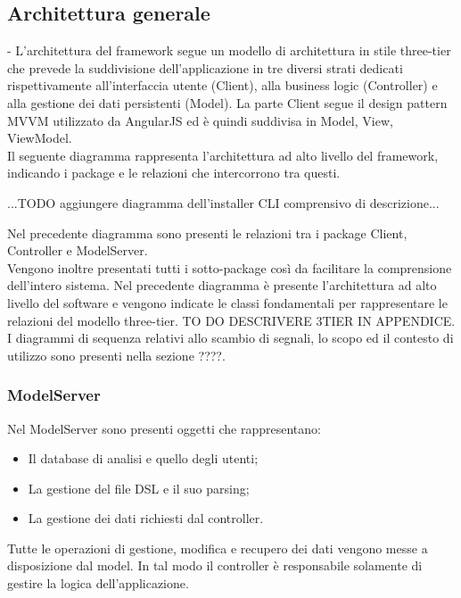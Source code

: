 \subsection{Architettura generale}
-	L'architettura del framework segue un modello di architettura in stile three-tier che prevede la suddivisione dell'applicazione  in tre diversi strati dedicati rispettivamente all'interfaccia utente (Client), alla business logic (Controller) e alla gestione dei dati persistenti (Model). La parte Client segue il design pattern MVVM utilizzato da AngularJS ed è quindi suddivisa in Model, View, ViewModel.\\


Il seguente diagramma rappresenta l'architettura ad alto livello del framework, indicando i package e le relazioni che intercorrono tra questi.

...TODO aggiungere diagramma dell'installer CLI comprensivo di descrizione...

Nel precedente diagramma sono presenti le relazioni tra i package Client, Controller e ModelServer.\\
Vengono inoltre presentati tutti i sotto-package così da facilitare la comprensione dell'intero sistema.
Nel precedente diagramma è presente l'architettura ad alto livello del software e vengono indicate le classi fondamentali per rappresentare le relazioni del modello  three-tier. TO DO DESCRIVERE 3TIER IN APPENDICE. I diagrammi di sequenza relativi allo scambio di segnali, lo scopo ed il contesto di utilizzo sono presenti nella sezione ????.

\newpage
\subsubsection{ModelServer}
Nel ModelServer sono presenti oggetti che rappresentano:
\begin{itemize}
\item Il database di analisi e quello degli utenti;
\item La gestione del file DSL e il suo parsing;
\item La gestione dei dati richiesti dal controller.
\end{itemize}
Tutte le operazioni di gestione, modifica e recupero dei dati vengono messe a disposizione dal model. In tal modo il controller è responsabile solamente di gestire la logica dell’applicazione.

